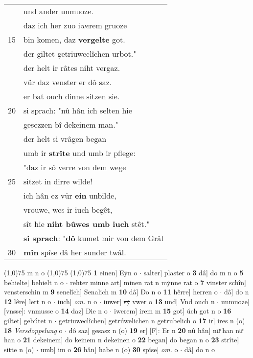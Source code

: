 \documentclass[8pt,a4paper,notitlepage]{article}
\begin{document}
\begin{table}[ht]
\begin{minipage}[t]{0.5\linewidth}
\begin{tabular}{rl}
 & und ander unmuoze.\\ 
 & daz ich her zuo i\textit{we}rem gruoze\\ 
15 & bin komen, daz \textbf{vergelte} got.\\ 
 & der giltet getriuweclîchen urbot."\\ 
 & der helt ir râtes niht vergaz.\\ 
 & vür daz venster er dô saz.\\ 
 & er bat ouch dinne sitzen sie.\\ 
20 & si sprach: "nû hân ich selten hie\\ 
 & gesezzen bî dekeinem man."\\ 
 & der helt si vrâgen  began\\ 
 & umb ir \textbf{strîte} und umb ir pflege:\\ 
 & "daz ir sô verre von dem wege\\ 
25 & sitzet in dirre wilde!\\ 
 & ich hân ez vür \textbf{ein} unbilde,\\ 
 & vrouwe, wes ir iuch begêt,\\ 
 & sît hie \textbf{niht bûwes umb iuch} stêt."\\ 
 & \textbf{si sprach}: "\textbf{dô} kumet mir von dem Grâl\\ 
30 & \textbf{mîn} spîse dâ her sunder twâl.\\ 
\end{tabular}
\scriptsize
\line(1,0){75} \newline
m n o \newline
\line(1,0){75} \newline
\newline
\line(1,0){75} \newline
\textbf{1} einen] Eẏn o  $\cdot$ salter] plaster o \textbf{3} dâ] do m n o \textbf{5} behielte] behielt n o  $\cdot$ rehter minne art] minen rat n mẏnne rat o \textbf{7} vinster schîn] vensterschin m \textbf{9} senelîch] Senalich m \textbf{10} dâ] Do n o \textbf{11} hêrre] herren o  $\cdot$ dâ] do n \textbf{12} lêre] lert n o  $\cdot$ iuch] \textit{om.} n o  $\cdot$ iuwer] \sout{sẏ} vwer o \textbf{13} und] Vnd ouch n  $\cdot$ unmuoze] [vnsse]: vnmusse o \textbf{14} daz] Die n o  $\cdot$ iwerem] irem m \textbf{15} got] úch got n o \textbf{16} giltet] gebútet n  $\cdot$ getriuweclîchen] getrúwelichen n getrubelich o \textbf{17} ir] ires n (o) \textbf{18} \textit{Versdoppelung} o   $\cdot$ dô saz] gesasz n (o) \textbf{19} er] [F]: Er n \textbf{20} nû hân] nuͯ han nuͯ han o \textbf{21} dekeinem] do keinem n dekeinen o \textbf{22} began] do began n o \textbf{23} strîte] sitte n (o)  $\cdot$ umb] im o \textbf{26} hân] habe n (o) \textbf{30} spîse] \textit{om.} o  $\cdot$ dâ] do n o \newline
\end{minipage}
\end{table}
\end{document}
